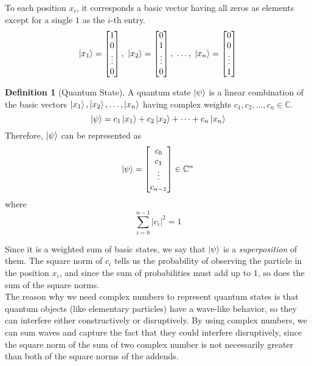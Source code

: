 \documentclass[12pt,a4paper]{report}
\theoremstyle{definition}
\newtheorem{definition}{Definition}[section]
\theoremstyle{definition}
\theoremstyle{definition}
\begin{document}
To each position $x_i$, it corresponds a basic vector having all zeros as elements except for a single $1$ as the $i$-th entry.
\begin{equation*}
    \ket{x_1} = \begin{bmatrix}
        1\\
        0\\
        \vdots\\
        0\\
    \end{bmatrix},\ 
    \ket{x_2} = \begin{bmatrix}
        0\\
        1\\
        \vdots\\
        0\\
    \end{bmatrix},\ \ldots,\ 
    \ket{x_n} = \begin{bmatrix}
        0\\
        0\\
        \vdots\\
        1\\
    \end{bmatrix}
\end{equation*}

\begin{definition}[Quantum State]
A quantum state $\ket{\psi}$ is a linear combination of the basic vectors $\ket{x_1}, \ket{x_2}, \ldots, \ket{x_n}$ having complex weights $c_1, c_2, \ldots, c_n \in \mathbb{C}$.
\begin{equation*}
    \ket{\psi}=c_1\ket{x_1}+c_2\ket{x_2}+\cdots+c_n\ket{x_n}
\end{equation*}
Therefore, $\ket{\psi}$ can be represented as
\begin{equation*}
    \ket{\psi}=\begin{bmatrix}
        c_0\\
        c_1\\
        \vdots\\
        c_{n-1}\\
    \end{bmatrix}\in \mathbb{C}^n
\end{equation*}
where
\begin{equation*}
    \sum_{i=0}^{n-1} \left\lvert c_i \right\rvert ^2 = 1
\end{equation*}
\end{definition}
Since it is a weighted sum of basic states, we say that $\ket{\psi}$ is a \textit{superposition} of them.
The square norm of $c_i$ tells us the probability of observing the particle in the position $x_i$, and since the sum of probabilities must add up to $1$, so does the sum of the square norms.\\
The reason why we need complex numbers to represent quantum states is that quantum objects (like elementary particles) have a wave-like behavior, so they can interfere either constructively or disruptively. By using complex numbers, we can sum waves and capture the fact that they could interfere disruptively, since the square norm of the sum of two complex number is not necessarily greater than both of the square norms of the addends.
\end{document}
